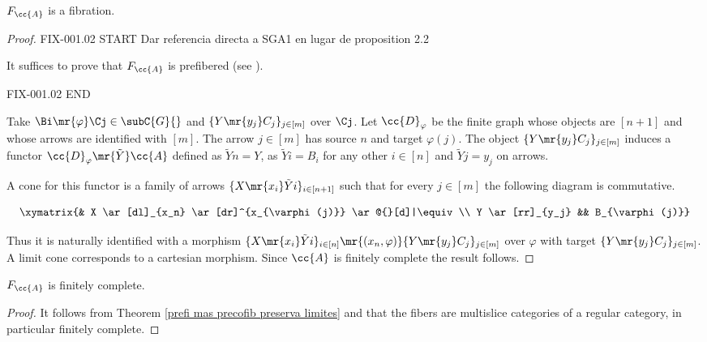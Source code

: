 \begin{proposition}\label{obtuvimos una fibracion}
$F_{\cc{A}}$ is a fibration.
\end{proposition}

\begin{proof}

{FIX-001.02 START Dar referencia directa a SGA1 en lugar de proposition 2.2}

It suffices to prove that $F_{\cc{A}}$ is prefibered (see \cite[page 143]{sga1}).

{FIX-001.02 END}



Take ${\Bi \mr{\varphi} \Cj \in \subC{G}{}}$ and  $\{Y \mr{y_j} C_j\}_{j \in [m]}$ over $\Cj$. Let $\cc{D}_{\varphi}$ be the finite graph whose objects are $[n+1]$ and whose arrows are identified with $[m]$. The arrow $j \in [m]$ has source $n$ and target $\varphi(j)$. The object $\{Y \mr{y_j} C_j\}_{j \in [m]}$ induces a functor ${\cc{D}_{\varphi} \mr{\tilde{Y}} \cc{A}}$ defined as $\tilde{Y}n=Y$, as $\tilde{Y}i=B_i$ for any other $i \in [n]$  and $\tilde{Y}j=y_j$ on arrows.

 A cone  for this functor is a family of arrows ${\{X \mr{x_i} \tilde{Y}i\}_{i \in [n+1]}}$ such that for every ${j\in[m]}$ the following diagram is commutative.
 
\[
\xymatrix{& X \ar[dl]_{x_n} \ar[dr]^{x_{\varphi(j)}} \ar@{}[d]|\equiv \\
		  Y \ar[rr]_{y_j} && B_{\varphi(j)}}
\] 
 
\noindent Thus it is naturally identified with a morphism ${\{X \mr{x_i} \tilde{Y}i\}_{i \in [n]} \mr{(x_n,\varphi)} \{Y \mr{y_j} C_j\}_{j \in [m]}}$ over $\varphi$ with target $\{Y \mr{y_j} C_j\}_{j \in [m]}$. A limit cone corresponds to a cartesian morphism. Since $\cc{A}$ is finitely complete the result follows.
\end{proof}

\begin{proposition}
 $F_{\cc{A}}$ is finitely complete.
\end{proposition}

\begin{proof}
It follows from Theorem \ref{prefi mas precofib preserva limites} and that the fibers are multislice categories of a regular category, in particular finitely complete.
\end{proof}


